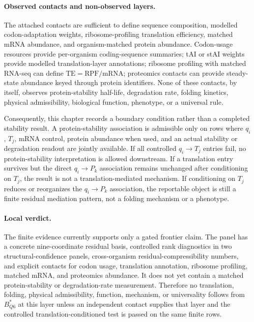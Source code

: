 \paragraph{Observed contacts and non-observed layers.}
The attached contacts are sufficient to define sequence composition, modelled codon-adaptation weights, ribosome-profiling translation efficiency, matched mRNA abundance, and organism-matched protein abundance. Codon-usage resources provide per-organism coding-sequence summaries; tAI or stAI weights provide modelled translation-layer annotations; ribosome profiling with matched RNA-seq can define $\mathrm{TE}=\mathrm{RPF}/\mathrm{mRNA}$; proteomics contacts can provide steady-state abundance keyed through protein identifiers. None of these contacts, by itself, observes protein-stability half-life, degradation rate, folding kinetics, physical admissibility, biological function, phenotype, or a universal rule.

Consequently, this chapter records a boundary condition rather than a completed stability result. A protein-stability association is admissible only on rows where $q_i$, $T_j$, mRNA control, protein abundance when used, and an actual stability or degradation readout are jointly available. If all controlled $q_i \to T_j$ entries fail, no protein-stability interpretation is allowed downstream. If a translation entry survives but the direct $q_i \to P_k$ association remains unchanged after conditioning on $T_j$, the result is not a translation-mediated mechanism. If conditioning on $T_j$ reduces or reorganizes the $q_i \to P_k$ association, the reportable object is still a finite residual mediation pattern, not a folding mechanism or a phenotype.

\paragraph{Local verdict.}
The finite evidence currently supports only a gated frontier claim. The panel has a concrete nine-coordinate residual basis, controlled rank diagnostics in two structural-confidence panels, cross-organism residual-compressibility numbers, and explicit contacts for codon usage, translation annotation, ribosome profiling, matched mRNA, and proteomics abundance. It does not yet contain a matched protein-stability or degradation-rate measurement. Therefore no translation, folding, physical admissibility, function, mechanism, or universality follows from $B^{*}_{Q6}$ at this layer unless an independent contact supplies that layer and the controlled translation-conditioned test is passed on the same finite rows.

